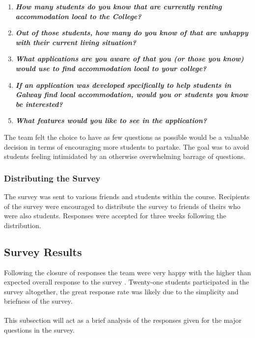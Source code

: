 \begin{enumerate}
    \item\textit{\textbf{How many students do you know that are currently renting accommodation local to the College?}}
    \item\textit{\textbf{Out of those students, how many do you know of that are unhappy with their current living situation?}}
    \item\textit{\textbf{What applications are you aware of that you (or those you know) would use to find accommodation local to your college?}}
    \item\textit{\textbf{If an application was developed specifically to help students in Galway find local accommodation, would you or students you know be interested?}}
    \item\textit{\textbf{What features would you like to see in the application?}}
\end{enumerate}

The team felt the choice to have as few questions as possible would be a valuable decision in terms of encouraging more students to partake. The goal was to avoid students feeling intimidated by an otherwise overwhelming barrage of questions.

\subsubsection{Distributing the Survey}
The survey was sent to various friends and students within the course. Recipients of the survey were encouraged to distribute the survey to friends of theirs who were also students. Responses were accepted for three weeks following the distribution. 

\subsection{Survey Results}
Following the closure of responses the team were very happy with the higher than expected overall response to the survey \cite{SURVEY}. Twenty-one students participated in the survey altogether, the great response rate was likely due to the simplicity and briefness of the survey. 

\paragraph{}
This subsection will act as a brief analysis of the responses given for the major questions in the survey.

